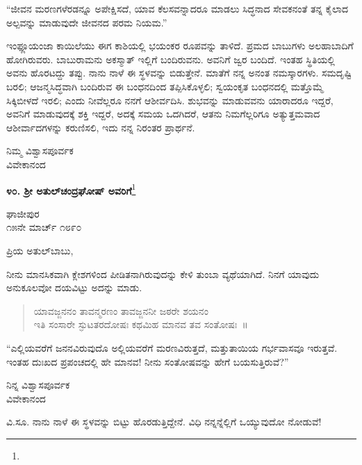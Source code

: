 “ಜೀವನ ಮರಣಗಳೆರಡನ್ನೂ ಅಪೇಕ್ಷಿಸದೆ, ಯಾವ ಕೆಲಸವನ್ನಾದರೂ ಮಾಡಲು ಸಿದ್ಧನಾದ ಸೇವಕನಂತೆ ತನ್ನ ಕೈಲಾದ ಅಲ್ಪವನ್ನು ಮಾಡುವುದೇ ಜೀವನದ ಪರಮ ನಿಯಮ.”

ಇಂಫ್ಲೂಯಂಜಾ ಕಾಯಿಲೆಯು ಈಗ ಕಾಶಿಯಲ್ಲಿ ಭಯಂಕರ ರೂಪವನ್ನು ತಾಳಿದೆ. ಪ್ರಮದ ಬಾಬುಗಳು ಅಲಹಾಬಾದಿಗೆ ಹೋಗಿರುವರು. ಬಾಬುರಾಮನು ಅಕಸ್ಮಾತ್ ಇಲ್ಲಿಗೆ ಬಂದಿರುವನು. ಅವನಿಗೆ ಜ್ವರ ಬಂದಿದೆ. ಇಂತಹ ಸ್ಥಿತಿಯಲ್ಲಿ ಅವನು ಹೊರಟದ್ದು ತಪ್ಪು. ನಾನು ನಾಳೆ ಈ ಸ್ಥಳವನ್ನು ಬಿಡುತ್ತೇನೆ. ಮಾತೆಗೆ ನನ್ನ ಅನಂತ ನಮಸ್ಕಾರಗಳು. ಸಮದೃಷ್ಟಿ ಬರಲಿ; ಆಜನ್ಮಸಿದ್ಧವಾಗಿ ಬಂದಿರುವ ಈ ಬಂಧನದಿಂದ ತಪ್ಪಿಸಿಕೊಳ್ಳಲಿ; ಸ್ವಯಂಕೃತ ಬಂಧನದಲ್ಲಿ ಮತ್ತೊಮ್ಮೆ ಸಿಕ್ಕಿಬೀಳದೆ ಇರಲಿ; ಎಂದು ನೀವೆಲ್ಲರೂ ನನಗೆ ಆಶೀರ್ವದಿಸಿ. ಶುಭವನ್ನು ಮಾಡುವವನು ಯಾರಾದರೂ ಇದ್ದರೆ, ಅವನಿಗೆ ಮಾಡುವುದಕ್ಕೆ ಶಕ್ತಿ ಇದ್ದರೆ, ಅದಕ್ಕೆ ಸಮಯ ಒದಗಿದರೆ, ಆತನು ನಿಮಗೆಲ್ಲರಿಗೂ ಅತ್ಯುತ್ತಮವಾದ ಆಶೀರ್ವಾದಗಳನ್ನು ಕರುಣಿಸಲಿ, ಇದು ನನ್ನ ನಿರಂತರ ಪ್ರಾರ್ಥನೆ.

\vspace{-0.5cm}

{\flushright
ನಿಮ್ಮ ವಿಶ್ವಾಸಪೂರ್ವಕ\\ವಿವೇಕಾನಂದ\par}

\begin{center}
\textbf{೪೦. ಶ‍್ರೀ ಅತುಲ್‌ಚಂದ್ರಘೋಷ್ ಅವರಿಗೆ}\footnote{}
\end{center}

\vspace{-0.5cm}

\begin{flushright}
ಘಾಜೀಪುರ\\೧೫ನೇ ಮಾರ್ಚ್ ೧೮೯೦
\end{flushright}

\noindent
ಪ್ರಿಯ ಅತುಲ್‌ಬಾಬು,

ನೀನು ಮಾನಸಿಕವಾಗಿ ಕ್ಲೇಶಗಳಿಂದ ಪೀಡಿತನಾಗಿರುವುದನ್ನು ಕೇಳಿ ತುಂಬಾ ವ್ಯಥೆಯಾಗಿದೆ. ನಿನಗೆ ಯಾವುದು ಅನುಕೂಲವೋ ದಯವಿಟ್ಟು ಅದನ್ನು ಮಾಡು.
\begin{verse}
 ಯಾವಜ್ಜನನಂ ತಾವನ್ಮರಣಂ ತಾವಜ್ಜನನೀ ಜಠರೇ ಶಯನಂ\\
 ಇತಿ ಸಂಸಾರೇ ಸ್ಫುಟತರದೋಷಃ ಕಥಮಿಹ ಮಾನವ ತವ ಸಂತೋಷಃ~॥ 
\end{verse}

“ಎಲ್ಲಿಯವರೆಗೆ ಜನನವಿರುವುದೊ ಅಲ್ಲಿಯವರೆಗೆ ಮರಣವಿರುತ್ತದೆ, ಮತ್ತು\break ತಾಯಿಯ ಗರ್ಭವಾಸವೂ ಇರುತ್ತವೆ. ಇಂತಹ ದುಃಖದ ಪ್ರಪಂಚದಲ್ಲಿ ಹೇ ಮಾನವ! ನೀನು ಸಂತೋಷವನ್ನು ಹೇಗೆ ಬಯಸುತ್ತಿರುವೆ?”

\vspace{-0.5cm}

\begin{flushright}
ನಿನ್ನ ವಿಶ್ವಾಸಪೂರ್ವಕ\\ವಿವೇಕಾನಂದ
\end{flushright}

ವಿ.ಸೂ. \enginline{-}ನಾನು ನಾಳೆ ಈ ಸ್ಥಳವನ್ನು ಬಿಟ್ಟು ಹೊರಡುತ್ತಿದ್ದೇನೆ. ವಿಧಿ ನನ್ನನ್ನೆಲ್ಲಿಗೆ ಒಯ್ಯುವುದೋ ನೋಡುವೆ!

